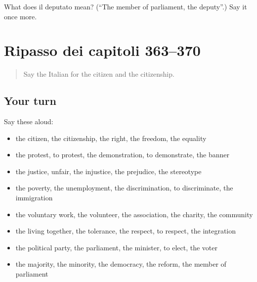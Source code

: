 \begin{tcolorbox}[breakable,colback=teal!4,colframe=teal!35!black,title={Before you move on}]
What does il deputato mean? (\textquotedblleft{}The member of parliament, the deputy\textquotedblright{}.) Say it once more.
\end{tcolorbox}
\section[(dialogue)]{Ripasso dei capitoli 363–370}

\label{lesson:IT-R370-ripasso-363-370}



\begin{quote}
Say the Italian for the citizen and the citizenship.
\end{quote}

\subsection*{Your turn}
Say these aloud:

\begin{itemize}
\raggedright
  \item the citizen, the citizenship, the right, the freedom, the equality
  \item the protest, to protest, the demonstration, to demonstrate, the banner
  \item the justice, unfair, the injustice, the prejudice, the stereotype
  \item the poverty, the unemployment, the discrimination, to discriminate, the immigration
  \item the voluntary work, the volunteer, the association, the charity, the community
  \item the living together, the tolerance, the respect, to respect, the integration
  \item the political party, the parliament, the minister, to elect, the voter
  \item the majority, the minority, the democracy, the reform, the member of parliament
\end{itemize}

